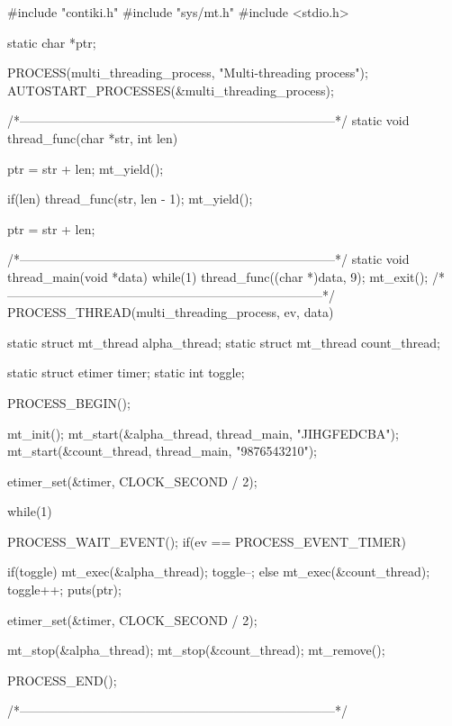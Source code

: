 \begin{DoxyCodeInclude}
#include "contiki.h"
#include "sys/mt.h"
#include <stdio.h>

static char *ptr;

PROCESS(multi_threading_process, "Multi-threading process");
AUTOSTART_PROCESSES(&multi_threading_process);

/*---------------------------------------------------------------------------*/
static void
thread_func(char *str, int len)
{
  ptr = str + len;
  mt_yield();

  if(len) {
    thread_func(str, len - 1);
    mt_yield();
  }

  ptr = str + len;
}
/*---------------------------------------------------------------------------*/
static void
thread_main(void *data)
{
  while(1) {
    thread_func((char *)data, 9);
  }
  mt_exit();
}
/*---------------------------------------------------------------------------*/
PROCESS_THREAD(multi_threading_process, ev, data)
{
  static struct mt_thread alpha_thread;
  static struct mt_thread count_thread;

  static struct etimer timer;
  static int toggle;

  PROCESS_BEGIN();

  mt_init();
  mt_start(&alpha_thread, thread_main, "JIHGFEDCBA");
  mt_start(&count_thread, thread_main, "9876543210");

  etimer_set(&timer, CLOCK_SECOND / 2);

  while(1) {
    PROCESS_WAIT_EVENT();
    if(ev == PROCESS_EVENT_TIMER) {
      if(toggle) {
        mt_exec(&alpha_thread);
        toggle--;
      } else {
        mt_exec(&count_thread);
        toggle++;
      }
      puts(ptr);

      etimer_set(&timer, CLOCK_SECOND / 2);
    }
  }
  
  mt_stop(&alpha_thread);
  mt_stop(&count_thread);
  mt_remove();

  PROCESS_END();
}
/*---------------------------------------------------------------------------*/
\end{DoxyCodeInclude}
 
